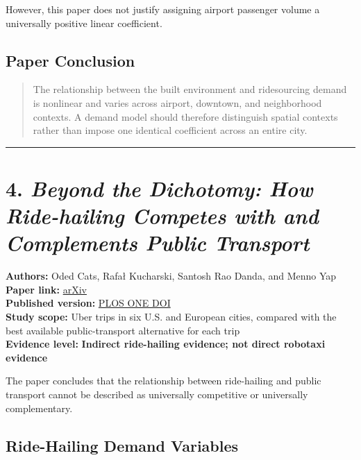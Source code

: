 \documentclass[10pt,a4paper]{article}
\begin{document}
However, this paper does not justify assigning airport passenger volume a universally positive linear coefficient.

\hypertarget{paper-conclusion-2}{%
\subsection{Paper Conclusion}\label{paper-conclusion-2}}

\begin{quote}
The relationship between the built environment and ridesourcing demand is nonlinear and varies across airport, downtown, and neighborhood contexts. A demand model should therefore distinguish spatial contexts rather than impose one identical coefficient across an entire city.
\end{quote}

\begin{center}\rule{0.5\linewidth}{0.5pt}\end{center}

\hypertarget{beyond-the-dichotomy-how-ride-hailing-competes-with-and-complements-public-transport}{%
\section{\texorpdfstring{4. \emph{Beyond the Dichotomy: How Ride-hailing Competes with and Complements Public Transport}}{4. Beyond the Dichotomy: How Ride-hailing Competes with and Complements Public Transport}}\label{beyond-the-dichotomy-how-ride-hailing-competes-with-and-complements-public-transport}}

\textbf{Authors:} Oded Cats, Rafał Kucharski, Santosh Rao Danda, and Menno Yap\\
\textbf{Paper link:} \href{https://arxiv.org/abs/2104.04208}{arXiv}\\
\textbf{Published version:} \href{https://doi.org/10.1371/journal.pone.0262496}{PLOS ONE DOI}\\
\textbf{Study scope:} Uber trips in six U.S. and European cities, compared with the best available public-transport alternative for each trip\\
\textbf{Evidence level:} \textbf{Indirect ride-hailing evidence; not direct robotaxi evidence}

The paper concludes that the relationship between ride-hailing and public transport cannot be described as universally competitive or universally complementary.

\hypertarget{ride-hailing-demand-variables}{%
\subsection{Ride-Hailing Demand Variables}\label{ride-hailing-demand-variables}}
\end{document}
